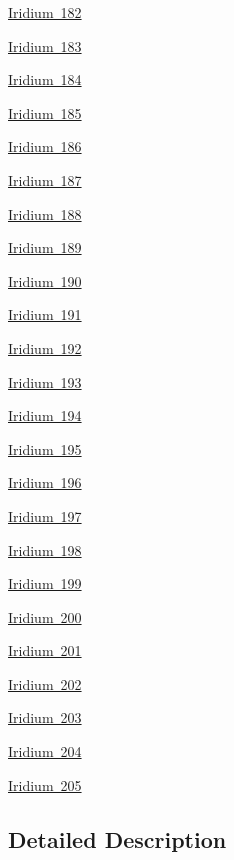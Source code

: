 \begin{DoxyCompactItemize}
\item 
\mbox{\hyperlink{group___isotope_const-_iridium-_ir182}{Iridium 182}}
\item 
\mbox{\hyperlink{group___isotope_const-_iridium-_ir183}{Iridium 183}}
\item 
\mbox{\hyperlink{group___isotope_const-_iridium-_ir184}{Iridium 184}}
\item 
\mbox{\hyperlink{group___isotope_const-_iridium-_ir185}{Iridium 185}}
\item 
\mbox{\hyperlink{group___isotope_const-_iridium-_ir186}{Iridium 186}}
\item 
\mbox{\hyperlink{group___isotope_const-_iridium-_ir187}{Iridium 187}}
\item 
\mbox{\hyperlink{group___isotope_const-_iridium-_ir188}{Iridium 188}}
\item 
\mbox{\hyperlink{group___isotope_const-_iridium-_ir189}{Iridium 189}}
\item 
\mbox{\hyperlink{group___isotope_const-_iridium-_ir190}{Iridium 190}}
\item 
\mbox{\hyperlink{group___isotope_const-_iridium-_ir191}{Iridium 191}}
\item 
\mbox{\hyperlink{group___isotope_const-_iridium-_ir192}{Iridium 192}}
\item 
\mbox{\hyperlink{group___isotope_const-_iridium-_ir193}{Iridium 193}}
\item 
\mbox{\hyperlink{group___isotope_const-_iridium-_ir194}{Iridium 194}}
\item 
\mbox{\hyperlink{group___isotope_const-_iridium-_ir195}{Iridium 195}}
\item 
\mbox{\hyperlink{group___isotope_const-_iridium-_ir196}{Iridium 196}}
\item 
\mbox{\hyperlink{group___isotope_const-_iridium-_ir197}{Iridium 197}}
\item 
\mbox{\hyperlink{group___isotope_const-_iridium-_ir198}{Iridium 198}}
\item 
\mbox{\hyperlink{group___isotope_const-_iridium-_ir199}{Iridium 199}}
\item 
\mbox{\hyperlink{group___isotope_const-_iridium-_ir200}{Iridium 200}}
\item 
\mbox{\hyperlink{group___isotope_const-_iridium-_ir201}{Iridium 201}}
\item 
\mbox{\hyperlink{group___isotope_const-_iridium-_ir202}{Iridium 202}}
\item 
\mbox{\hyperlink{group___isotope_const-_iridium-_ir203}{Iridium 203}}
\item 
\mbox{\hyperlink{group___isotope_const-_iridium-_ir204}{Iridium 204}}
\item 
\mbox{\hyperlink{group___isotope_const-_iridium-_ir205}{Iridium 205}}
\end{DoxyCompactItemize}


\subsection{Detailed Description}
